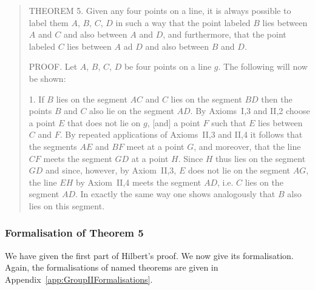 \begin{quote}
THEOREM 5. Given any four points on a line, it is always possible to label them $A$, $B$, $C$, $D$ in such a way that the point labeled $B$ lies between $A$ and $C$ and also between $A$ and $D$, and furthermore, that the point labeled $C$ lies between $A$ ad $D$ and also between $B$ and $D$.

PROOF. Let $A$, $B$, $C$, $D$ be four points on a line $g$. The following will now be shown:

1. If $B$ lies on the segment $AC$ and $C$ lies on the segment $BD$ then the points $B$ and $C$ also lie on the segment $AD$. By Axioms~I,3 and II,2 choose a point $E$ that does not lie on $g$, [and] a point $F$ such that $E$ lies between $C$ and $F$. By repeated applications of Axioms~II,3 and II,4 it follows that the segments $AE$ and $BF$ meet at a point $G$, and moreover, that the line $CF$ meets the segment $GD$ at a point $H$. Since $H$ thus lies on the segment $GD$ and since, however, by Axiom~II,3, $E$ does not lie on the segment $AG$, the line $EH$ by Axiom~II,4 meets the segment $AD$, i.e. $C$ lies on the segment $AD$. In exactly the same way one shows analogously that $B$ also lies on this segment.
\end{quote}

\subsubsection{Formalisation of Theorem 5}
We have given the first part of Hilbert's proof. We now give its formalisation. Again, the formalisations of named theorems are given in Appendix~\ref{app:GroupIIFormalisations}.

